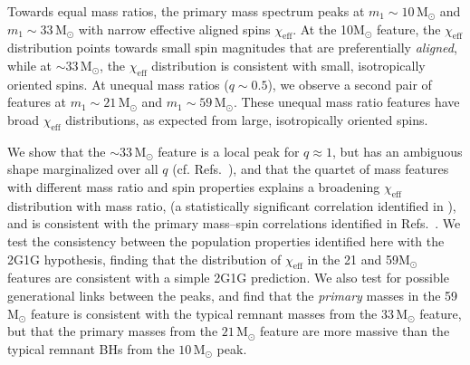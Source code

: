\documentclass[%
    aps,
    prl,
    reprint,
    superscriptaddress,
    nolongbibliography,
    nobibnotes,
    nofootinbib,
    linenumbers,
    amsmath,amssymb,
]{revtex4-2}
\newcommand{\Msun}{\ensuremath{\mathrm{M}_{\odot}}}
\newcommand{\chieff}{\ensuremath{\chi_{\mathrm{eff}}}}
\newcommand{\twoGoneG}{\ac{2G1G}\xspace}
\newcommand{\jh}[1]{{\color{orange}JH: #1}}
\newcommand{\mm}[1]{{\color{ForestGreen}MM: #1}}
\newcommand{\featTen}{10\xspace}
\newcommand{\featTwenty}{21\xspace}
\newcommand{\featThirtyFive}{33\xspace}
\newcommand{\featSixty}{59\xspace}
\begin{document}
Towards equal mass ratios, the primary mass spectrum peaks at $m_1 \sim\featTen \,\Msun$ and $m_1\sim \featThirtyFive\,\Msun$ with narrow effective aligned spins $\chieff$. At the \featTen $\Msun$ feature, the $\chieff$ distribution points towards small spin magnitudes that are preferentially \textit{aligned}, while at $\sim\featThirtyFive\,\Msun$, the $\chieff$ distribution is consistent with small, isotropically oriented spins. At unequal mass ratios ($q\sim 0.5$), we observe a second pair of features at $m_1 \sim \featTwenty\,\Msun$ and $m_1\sim \featSixty\,\Msun$. These unequal mass ratio features have broad $\chieff$ distributions, as expected from large, isotropically oriented spins.


We show that the $\sim \featThirtyFive\,\Msun$ feature is a local peak for $q\approx 1$, but has an ambiguous shape marginalized over all $q$ (cf. Refs.~\citet{LIGOScientific:2025pvj, LIGOScientific:2026ctl}), and that the quartet of mass features with different mass ratio and spin properties explains a broadening $\chieff$ distribution with mass ratio, (a statistically significant correlation identified in \citet{LIGOScientific:2026ctl}), and is consistent with the primary mass--spin correlations identified in Refs.~\cite{Antonini:2025ilj, Tong:2025xir, Plunkett:2026pxt, Flanagan:2026ayy}.
We test the consistency between the population properties identified here with the \twoGoneG hypothesis, finding that the distribution of $\chieff$ in the \featTwenty and \featSixty $\Msun$ features are consistent with a simple \twoGoneG prediction. We also test for possible generational links between the peaks, and find that the \textit{primary} masses in the \featSixty $\Msun$ feature is consistent with the typical remnant masses from the $\featThirtyFive\,\Msun$ feature, but that the primary masses from the $\featTwenty\,\Msun$ feature are more massive than the typical remnant \acp{BH} from the $\featTen\,\Msun$ peak. %
\end{document}
